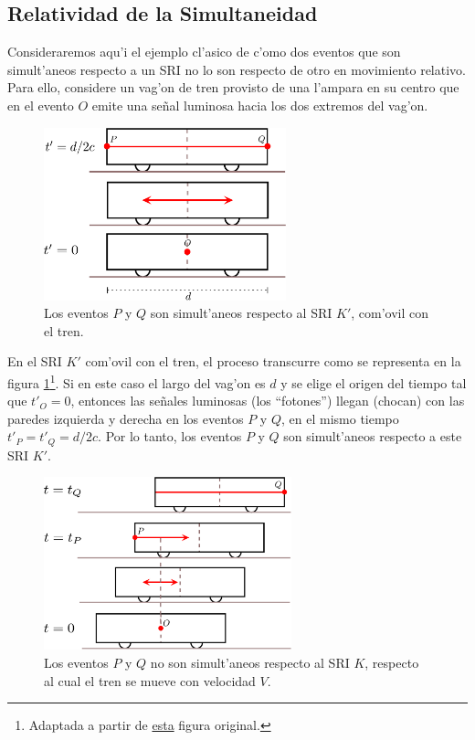 \subsection{Relatividad de la Simultaneidad}
Consideraremos aqu'i el ejemplo cl'asico de c'omo dos eventos que son simult'aneos respecto a un SRI no lo son respecto de otro en movimiento relativo. Para ello, considere un vag'on de tren provisto de una l'ampara en su centro que en el evento $O$ emite una se\~nal luminosa hacia los dos extremos del vag'on.
\begin{figure}[H]
\centerline{\includegraphics[height= 5cm]{fig/fig-diagrama-simultaneidad-01.pdf}}
\caption{Los eventos $P$ y $Q$ son simult'aneos respecto al SRI $K'$, com'ovil con el tren.}
\label{sim01}
\end{figure}
En el SRI $K'$ com'ovil con el tren, el proceso transcurre como se representa en la figura \ref{sim01}\footnote{Adaptada a partir de  \href{http://commons.wikimedia.org/wiki/File:Traincar_Relativity1.svg}{esta} figura original.}. Si en este caso el largo del vag'on es $d$ y se elige el origen del tiempo tal que $t'_O=0$, entonces las se\~nales luminosas (los ``fotones'') llegan (chocan) con las paredes izquierda y derecha en los eventos $P$ y $Q$, en el mismo tiempo $t'_P=t'_Q=d/2c$. Por lo tanto, los eventos $P$ y $Q$ son simult'aneos respecto a este SRI $K'$.
\begin{figure}[H]
\centerline{\includegraphics[height= 5cm]{fig/fig-diagrama-simultaneidad-02.pdf}}
\caption{Los eventos $P$ y $Q$ no son simult'aneos respecto al SRI $K$, respecto al cual el tren se mueve con velocidad $V$.}
\label{sim02}
\end{figure}

